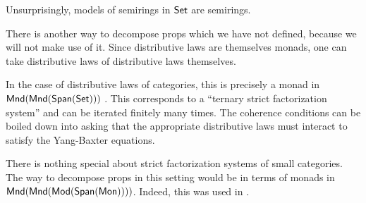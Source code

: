 Unsurprisingly, models of semirings in $\mathsf{Set}$ are semirings.


\begin{aside}
There is another way to decompose props which we have not defined, because we will not make use of it.    Since distributive laws are themselves monads, one can take distributive laws of distributive laws themselves. 


In the case of distributive laws of categories, this is precisely a monad in ${\sf Mnd}({\sf Mnd}(\mathsf{Span}(\mathsf{Set})))$ \cite{iterdist}.  This corresponds to a ``ternary strict factorization system'' and can be iterated finitely many times. The coherence conditions can be boiled down into asking that the appropriate distributive laws must interact to satisfy the Yang-Baxter equations.

There is nothing special about strict factorization systems of small categories.  The way to decompose props in this setting would be in terms of monads in ${\sf Mnd}({\sf Mnd}({\sf Mod}(\mathsf{Span}({\sf Mon}))))$.  Indeed, this was used in \cite[Proposition 3.3., Example 2.34]{ih}.
\end{aside}

%
%
%
%


